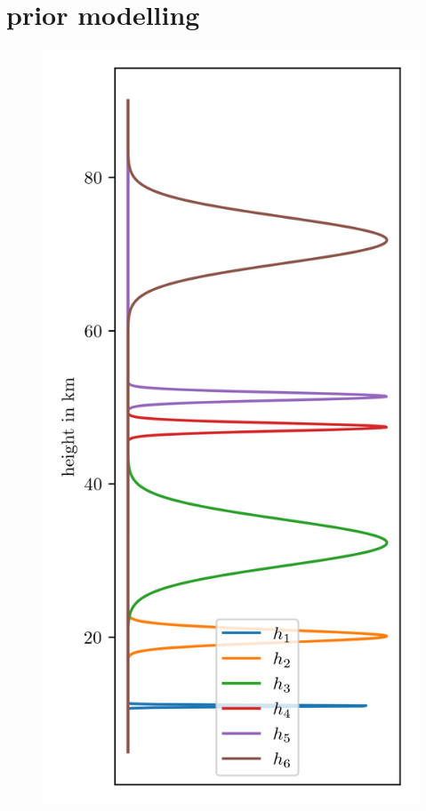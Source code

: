 \chapter{prior modelling}

\begin{figure}[ht!]
	\centering
	
	\caption[]{}
	\label{fig:TruePressFunc}
\end{figure}


\begin{figure}[ht!]
	\centering
	
	\caption[]{}
	\label{fig:TrueTempFunc}
\end{figure}

\begin{figure}[ht!]
	\centering
	\includegraphics{HeightPriors.png}
	\caption[]{}
	\label{fig:HeightPriors}
\end{figure}




